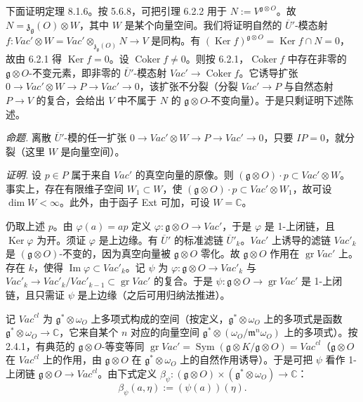  下面证明定理 8.1.6。按 5.6.8，可把引理 6.2.2 用于 $N:=V^{\mathfrak{g}\otimes O}$。故 $N=\mathfrak{z}_{\mathfrak{g}}(O)\otimes W$，其中 $W$ 是某个向量空间。我们将证明自然的 $\overline{U}'$-模态射 $f:\mathit{Vac}'\otimes W=\mathit{Vac}'\otimes_{\mathfrak{z}_{\mathfrak{g}}(O)}N\to V$ 是同构。有 $(\operatorname{Ker}f)^{\mathfrak{g}\otimes O}=\operatorname{Ker}f\cap N=0$，故由 6.2.1 得 $\operatorname{Ker}f=0$。设 $\operatorname{Coker}f\neq 0$。则按 6.2.1，$\operatorname{Coker}f$ 中存在非零的 $\mathfrak{g}\otimes O$-不变元素，即非零的 $\overline{U}'$-模态射 $\mathit{Vac}'\to\operatorname{Coker}f$。它诱导扩张 $0\to\mathit{Vac}'\otimes W\to P\to\mathit{Vac}'\to 0$，该扩张不分裂（分裂 $\mathit{Vac}'\to P$ 与自然态射 $P\to V$ 的复合，会给出 $V$ 中不属于 $N$ 的 $\mathfrak{g}\otimes O$-不变向量）。于是只剩证明下述陈述。

 \emph{命题.} 离散 $\overline{U}'$-模的任一扩张 $0\to\mathit{Vac}'\otimes W\to P\to\mathit{Vac}'\to 0$，只要 $IP=0$，就分裂（这里 $W$ 是向量空间）。

\emph{证明.} 设 $p\in P$ 属于来自 $\mathit{Vac}'$ 的真空向量的原像。则 $(\mathfrak{g}\otimes O)\cdot p\subset\mathit{Vac}'\otimes W$。事实上，存在有限维子空间 $W_1\subset W$，使 $(\mathfrak{g}\otimes O)\cdot p\subset\mathit{Vac}'\otimes W_1$，故可设 $\dim W<\infty$。此外，由于函子 Ext 可加，可设 $W=\mathbb{C}$。

仍取上述 $p$。由 $\varphi(a)=ap$ 定义 $\varphi:\mathfrak{g}\otimes O\to\mathit{Vac}'$，于是 $\varphi$ 是 1-上闭链，且 $\operatorname{Ker}\varphi$ 为开。须证 $\varphi$ 是上边缘。有 $\overline{U}'$ 的标准滤链 $\overline{U}'_k$。$\mathit{Vac}'$ 上诱导的滤链 $\mathit{Vac}'_k$ 是 $(\mathfrak{g}\otimes O)$-不变的，因为真空向量被 $\mathfrak{g}\otimes O$ 零化。故 $\mathfrak{g}\otimes O$ 作用在 $\operatorname{gr}\mathit{Vac}'$ 上。存在 $k$，使得 $\operatorname{Im}\varphi\subset\mathit{Vac}'_k$。记 $\psi$ 为 $\varphi:\mathfrak{g}\otimes O\to\mathit{Vac}'_k$ 与 $\mathit{Vac}'_k\to\mathit{Vac}'_k/\mathit{Vac}'_{k-1}\subset\operatorname{gr}\mathit{Vac}'$ 的复合。于是 $\psi:\mathfrak{g}\otimes O\to\operatorname{gr}\mathit{Vac}'$ 是 1-上闭链，且只需证 $\psi$ 是上边缘（之后可用归纳法推进）。


记 $\mathit{Vac}^{cl}$ 为 $\mathfrak{g}^*\otimes\omega_O$ 上多项式构成的空间（按定义，$\mathfrak{g}^*\otimes\omega_O$ 上的多项式是函数 $\mathfrak{g}^*\otimes\omega_O\to\mathbb{C}$，它来自某个 $n$ 对应的向量空间 $\mathfrak{g}^*\otimes(\omega_O/\mathfrak{m}^n\omega_O)$ 上的多项式）。按 2.4.1，有典范的 $\mathfrak{g}\otimes O$-等变等同 $\operatorname{gr}\mathit{Vac}'=\operatorname{Sym}(\mathfrak{g}\otimes K/\mathfrak{g}\otimes O)=\mathit{Vac}^{cl}$（$\mathfrak{g}\otimes O$ 在 $\mathit{Vac}^{cl}$ 上的作用，由 $\mathfrak{g}\otimes O$ 在 $\mathfrak{g}^*\otimes\omega_O$ 上的自然作用诱导）。于是可把 $\psi$ 看作 1-上闭链 $\mathfrak{g}\otimes O\to\mathit{Vac}^{cl}$。由下式定义 $\beta_\psi:(\mathfrak{g}\otimes O)\times(\mathfrak{g}^*\otimes\omega_O)\to\mathbb{C}$：
\begin{equation}\tag{293}
\beta_\psi(a,\eta):=(\psi(a))(\eta).
\end{equation}

